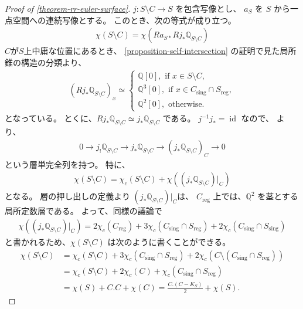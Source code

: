 \documentclass[a4paper,dvipdfmx,reqno,12pt]{amsart}
\theoremstyle{definition}
\newcommand{\opn}[1]{\operatorname{#1}}
\numberwithin{equation}{section}
\begin{document}
\begin{proof}[{Proof of \cref{theorem-rr-euler-surface}}]

$j\colon S\setminus C\to S$ を包含写像とし、
$a_S$ を $S$ から一点空間への連続写像とする。
このとき、次の等式が成り立つ。
\begin{align}
\chi(S\setminus C)=\chi(Ra_{S*}Rj_*\mathbb{Q}_{S\setminus C}) 
\end{align}
$C$が$S$上中庸な位置にあるとき、
\cref{proposition-self-intersection}
の証明で見た局所錐の構造の分類より、
\begin{align}
(Rj_*\mathbb{Q}_{S\setminus C})_x
\simeq
\begin{cases}
\mathbb{Q}[0], \text{ if } x\in S\setminus C, \\
\mathbb{Q}^3[0], \text{ if } x\in C_{\mathrm{sing}}
\cap S_{\mathrm{reg}}, \\
\mathbb{Q}^2[0], \text{ otherwise.}  
\end{cases}  
\end{align}
となっている。
とくに、$Rj_*\mathbb{Q}_{S\setminus C}\simeq
j_*\mathbb{Q}_{S\setminus C}$ である。
$j^{-1}j_*=\opn{id}$ なので、
\cite[Proposition 2.3.6 (v)]{MR1299726} より、
\begin{align}
0\to j_!\mathbb{Q}_{S\setminus C} 
\to j_* \mathbb{Q}_{S\setminus C}
\to (j_*\mathbb{Q}_{S\setminus C})_{C} \to 0
\end{align}
という層単完全列を持つ。
特に、
\begin{align}
\chi(S\setminus C)=
\chi_c(S\setminus C)+\chi((j_*\mathbb{Q}_{S\setminus C})|_C)
\end{align}
となる。
層の押し出しの定義より
$(j_*\mathbb{Q}_{S\setminus C})|_C$は、
$C_{\opn{reg}}$ 上では、$\mathbb{Q}^2$
を茎とする局所定数層である。
よって、同様の議論で
\begin{align}
\chi((j_*\mathbb{Q}_{S\setminus C})|_C)=
2\chi_c(C_{\mathrm{reg}})+
3\chi_c(C_{\mathrm{sing}}\cap S_{\mathrm{reg}})+
2\chi_c(C_{\mathrm{sing}}\cap S_{\mathrm{sing}})
\end{align}
と書かれるため、$\chi(S\setminus C)$
は次のように書くことができる。
\begin{align}
\label{equation-euler-calculus}
\chi(S\setminus C)&=
\chi_c(S\setminus C)+
3\chi_c(C_{\mathrm{sing}}
\cap S_{\mathrm{reg}})+
2\chi_c(C\setminus (C_{\mathrm{sing}}
\cap S_{\mathrm{reg}}))\\
&=\chi_c(S\setminus C)+2\chi_c(C)+
\chi_c(C_{\mathrm{sing}}
\cap S_{\mathrm{reg}}) \\
&=\chi(S)+C.C+\chi(C)
=\frac{C.(C-K_S)}{2}+\chi(S).
\end{align}
\end{proof}
\end{document}
